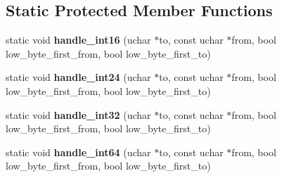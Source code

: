 \subsection*{Static Protected Member Functions}
\begin{DoxyCompactItemize}
\item 
\mbox{\label{classField_a3a61720364e08f6c1f8313bf84f5ddd0}} 
static void {\bfseries handle\+\_\+int16} (uchar $\ast$to, const uchar $\ast$from, bool low\+\_\+byte\+\_\+first\+\_\+from, bool low\+\_\+byte\+\_\+first\+\_\+to)
\item 
\mbox{\label{classField_a8fdf90c04bd6b02cbe2597a11822748b}} 
static void {\bfseries handle\+\_\+int24} (uchar $\ast$to, const uchar $\ast$from, bool low\+\_\+byte\+\_\+first\+\_\+from, bool low\+\_\+byte\+\_\+first\+\_\+to)
\item 
\mbox{\label{classField_af8f2f3b61085469fb86fe3554c12a63e}} 
static void {\bfseries handle\+\_\+int32} (uchar $\ast$to, const uchar $\ast$from, bool low\+\_\+byte\+\_\+first\+\_\+from, bool low\+\_\+byte\+\_\+first\+\_\+to)
\item 
\mbox{\label{classField_af537483a0991448093630823806b8d2e}} 
static void {\bfseries handle\+\_\+int64} (uchar $\ast$to, const uchar $\ast$from, bool low\+\_\+byte\+\_\+first\+\_\+from, bool low\+\_\+byte\+\_\+first\+\_\+to)
\end{DoxyCompactItemize}
